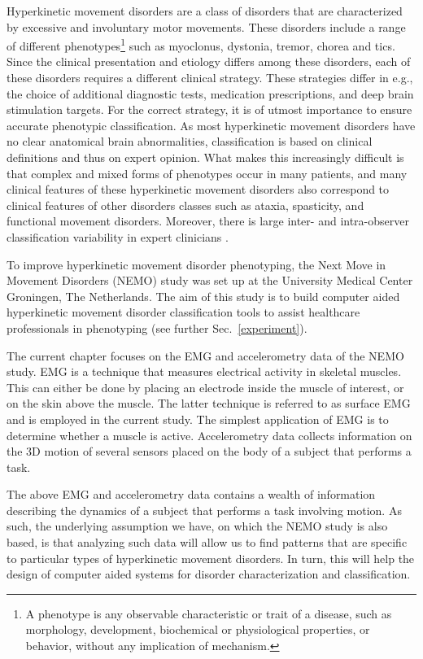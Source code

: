 Hyperkinetic movement disorders are a class of disorders that are characterized by excessive and involuntary motor movements. These disorders include a range of different phenotypes\footnote{A phenotype is any observable characteristic or trait of a disease, such as morphology, development, biochemical or physiological properties, or behavior, without any implication of mechanism.} such as myoclonus, dystonia, tremor, chorea and tics. Since the clinical presentation and etiology differs among these disorders, each of these disorders requires a different clinical strategy. These strategies differ in e.g., the choice of additional diagnostic tests, medication prescriptions, and deep brain stimulation targets. For the correct strategy, it is of utmost importance to ensure accurate phenotypic classification. As most hyperkinetic movement disorders have no clear anatomical brain abnormalities, classification is based on clinical definitions and thus on expert opinion. What makes this increasingly difficult is that complex and mixed forms of phenotypes occur in many patients, and many clinical features of these hyperkinetic movement disorders also correspond to clinical features of other disorders classes such as ataxia, spasticity, and functional movement disorders. Moreover, there is large inter- and intra-observer classification variability in expert clinicians \citep{VANDERVEEN2021176,defazio,eggink,beghi,vandersalm}.

To improve hyperkinetic movement disorder phenotyping, the Next Move in Movement Disorders (NEMO) \citep{NEMO} study was set up at the University Medical Center Groningen, The Netherlands. The aim of this study is to build computer aided hyperkinetic movement disorder classification tools to assist healthcare professionals in phenotyping (see further Sec.~\ref{experiment}). 

The current chapter focuses on the EMG and accelerometry data of the NEMO study. EMG is a technique that measures electrical activity in skeletal muscles. This can either be done by placing an electrode inside the muscle of interest, or on the skin above the muscle. The latter technique is referred to as surface EMG and is employed in the current study. The simplest application of EMG is to determine whether a muscle is active. Accelerometry data collects information on the 3D motion of several sensors placed on the body of a subject that performs a task.

The above EMG and accelerometry data contains a wealth of information describing the dynamics of a subject that performs a task involving motion. As such, the underlying assumption we have, on which the NEMO study is also based, is that analyzing such data will allow us to find patterns that are specific to particular types of hyperkinetic movement disorders. In turn, this will help the design of computer aided systems for disorder characterization and classification.

